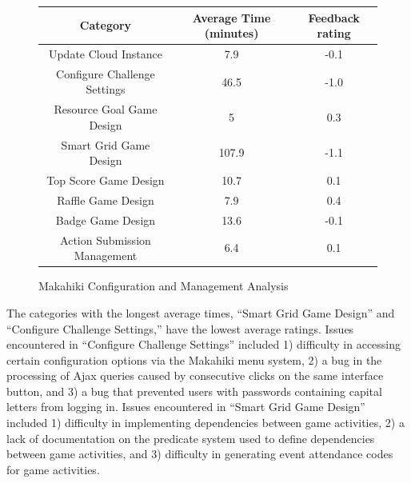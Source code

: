 \documentclass{sigchi}
\newcommand\tabhead[1]{\small\textbf{#1}}
\begin{document}
\begin{figure}[ht!]
  \centering
  \begin{tabular}{|c|c|c|}
    \hline
    \multicolumn{1}{|p{0.5\columnwidth}|}{\centering\tabhead{Category}} &
    \multicolumn{1}{|p{0.2\columnwidth}|}{\centering\tabhead{Average Time (minutes)}} &
    \multicolumn{1}{|p{0.2\columnwidth}|}{\centering\tabhead{Feedback rating}} \\
    \hline
    \multicolumn{1}{|p{0.5\columnwidth}|}{Update Cloud Instance} &
    \multicolumn{1}{|p{0.2\columnwidth}|}{7.9} &
    \multicolumn{1}{|p{0.2\columnwidth}|}{-0.1} \\
    \hline
    \multicolumn{1}{|p{0.5\columnwidth}|}{Configure Challenge Settings} &
    \multicolumn{1}{|p{0.2\columnwidth}|}{46.5} &
    \multicolumn{1}{|p{0.2\columnwidth}|}{-1.0} \\
    \hline
    \multicolumn{1}{|p{0.5\columnwidth}|}{Resource Goal Game Design} &
    \multicolumn{1}{|p{0.2\columnwidth}|}{5} &
    \multicolumn{1}{|p{0.2\columnwidth}|}{0.3} \\
    \hline
    \multicolumn{1}{|p{0.5\columnwidth}|}{Smart Grid Game Design} &
    \multicolumn{1}{|p{0.2\columnwidth}|}{107.9} &
    \multicolumn{1}{|p{0.2\columnwidth}|}{-1.1} \\
    \hline
    \multicolumn{1}{|p{0.5\columnwidth}|}{Top Score Game Design} &
    \multicolumn{1}{|p{0.2\columnwidth}|}{10.7} &
    \multicolumn{1}{|p{0.2\columnwidth}|}{0.1} \\
    \hline
    \multicolumn{1}{|p{0.5\columnwidth}|}{Raffle Game Design} &
    \multicolumn{1}{|p{0.2\columnwidth}|}{7.9} &
    \multicolumn{1}{|p{0.2\columnwidth}|}{0.4} \\
    \hline
    \multicolumn{1}{|p{0.5\columnwidth}|}{Badge Game Design} &
    \multicolumn{1}{|p{0.2\columnwidth}|}{13.6} &
    \multicolumn{1}{|p{0.2\columnwidth}|}{-0.1} \\
    \hline
    \multicolumn{1}{|p{0.5\columnwidth}|}{Action Submission Management} &
    \multicolumn{1}{|p{0.2\columnwidth}|}{6.4} &
    \multicolumn{1}{|p{0.2\columnwidth}|}{0.1} \\
    \hline
  \end{tabular}
  \caption{Makahiki Configuration and Management Analysis}
  \label{fig:makahiki-configuration-management}
\end{figure}

The categories with the longest average times, ``Smart Grid Game Design'' and ``Configure 
Challenge Settings,'' have the lowest average ratings. Issues encountered in ``Configure 
Challenge Settings'' included 1) difficulty in accessing certain configuration options via 
the Makahiki menu system, 2) a bug in the processing of Ajax queries caused by consecutive 
clicks on the same interface button, and 3) a bug that prevented users with passwords 
containing capital letters from logging in. Issues encountered in ``Smart Grid Game Design'' 
included 1) difficulty in implementing dependencies between game activities,  2) a lack 
of documentation on the predicate system used to define dependencies between game 
activities, and 3) difficulty in generating event attendance codes for game activities. 
\end{document}
